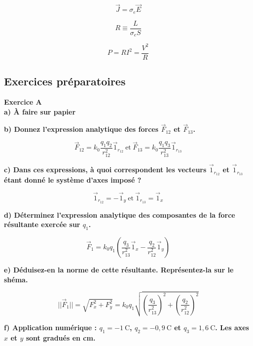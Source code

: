 \documentclass	[11pt, a4paper, openany]{book}
\newcommand{\E}{\vec E}
\newcommand{\exerc}[2]{\textbf{\Large Exercice #1\normalsize \\#2}}
\begin{document}
	\vspace{3.5cm}
	
	
	$$ \vec J = \sigma_e \E $$
	
	
	$$ R \equiv \dfrac{L}{\sigma_e S} $$
	
	
	$$ P = R I^2 = \dfrac{V^2}{R}$$
	\newpage
	\subsection{Exercices préparatoires}
\exerc{A}{a) À faire sur papier}
	
	\textbf{b) Donnez l'expression analytique des forces $\vec F_{12}$ et $\vec F_{13}$.}
	
	$$\vec F_{12} = k_0 \dfrac{q_1q_2}{r_{12}^2} \vec 1_{r_{12}}\ \text{et}\ \vec F_{13} = k_0 \dfrac{q_1q_3}{r_{13}^2} \vec 1_{r_{13}}$$
	
	\textbf{c) Dans ces expressions, à quoi correspondent les vecteurs $\vec 1_{r_{12}}$ et $\vec 1_{r_{13}}$ étant donné le système d'axes imposé ?}
	
	$$\vec 1_{r_{12}} = - \vec 1_y\ \text{et}\ \vec 1_{r_{13}} = \vec 1_x$$
	
	\textbf{d) Déterminez l'expression analytique des composantes de la force résultante exercée sur $q_1$.}
	
	$$\vec F_1 = k_0 q_1 \left( \dfrac{q_3}{r_{13}^2} \vec 1_x - \dfrac{q_2}{r_{12}^2} \vec 1_y \right)$$
	
	\textbf{e) Déduisez-en la norme de cette résultante. Représentez-la sur le shéma.}
	
	$$||\vec F_1|| = \sqrt{F_x^2 + F_y^2} = k_0 q_1 \sqrt{ \left( \dfrac{q_3}{r_{13}^2} \right)^2 + \left(  \dfrac{q_2}{r_{12}^2} \right)^2 }$$
	
	\textbf{f) Application numérique : $q_1 = -1\ \text{C}$, $q_2 = -0,9\ \text{C}$ et $q_3 = 1,6\ \text{C}$. Les axes $x$ et $y$ sont gradués en cm.}
\end{document}
